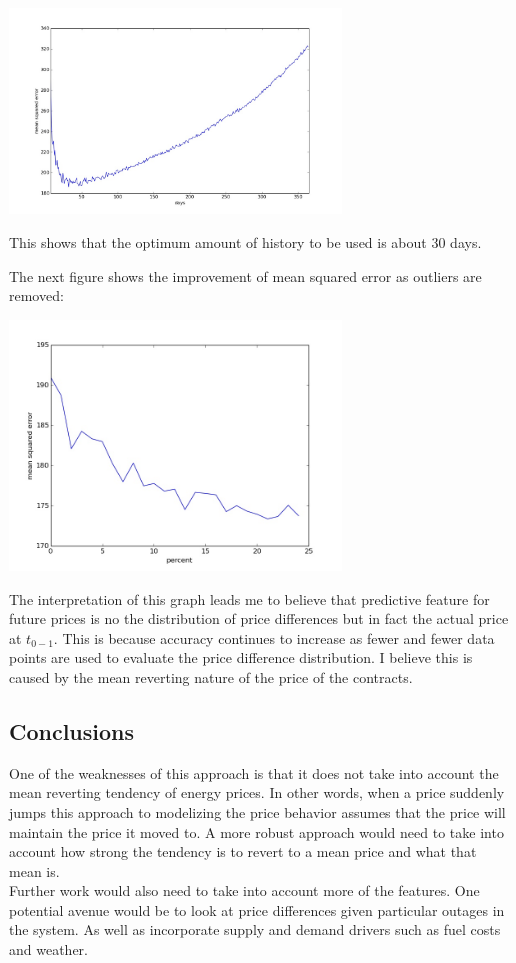 \documentclass{report}
\begin{document}
\begin{center}
\includegraphics[width=250pt, keepaspectratio=true]{mean_squared_error.jpg}
\end{center}

This shows that the optimum amount of history to be used is about 30 days.

The next figure shows the improvement of mean squared error as outliers are removed:
\begin{center}
\includegraphics[width=250pt, keepaspectratio=true]{outlier_error.jpg}
\end{center}
The interpretation of this graph leads me to believe that predictive feature for
future prices is no the distribution of price differences but in fact the actual
price at $t_{0-1}$. This is because accuracy continues to increase as fewer and
fewer data points are used to evaluate the price difference distribution. I believe
this is caused by the mean reverting nature of the price of the contracts.

\subsection*{Conclusions}

One of the weaknesses of this approach is that it does not take into account the
mean reverting tendency of energy prices. In other words, when a price suddenly
jumps this approach to modelizing the price behavior assumes that the price will
maintain the price it moved to. A more robust approach would need to take into account
how strong the tendency is to revert to a mean price and what that mean is.\\

Further work would also need to take into account more of the features. One potential
avenue would be to look at price differences given particular outages in the system.
As well as incorporate supply and demand drivers such as fuel costs and weather.

\nocite{*}


\end{document}

